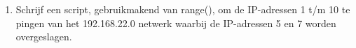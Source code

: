 \begin{enumerate}
\item Schrijf een script, gebruikmakend van range(), om de IP-adressen 1 t/m 10 te pingen van het 192.168.22.0 netwerk waarbij de IP-adressen 5 en 7 worden overgeslagen.
\end{enumerate}
